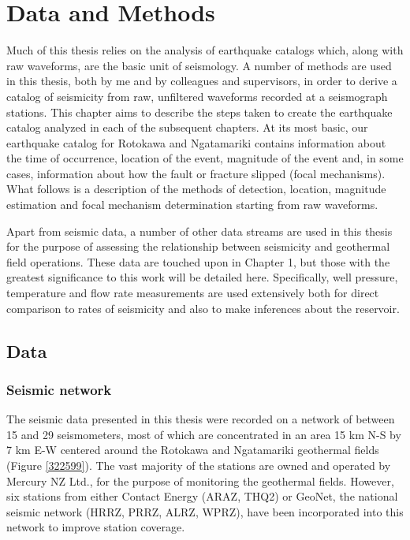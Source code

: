 \chapter{Data and Methods}
Much of this thesis relies on the analysis of earthquake catalogs which, along with raw waveforms, are the basic unit of seismology. A number of methods are used in this thesis, both by me and by colleagues and supervisors, in order to derive a catalog of seismicity from raw, unfiltered waveforms recorded at a seismograph stations. This chapter aims to describe the steps taken to create the earthquake catalog analyzed in each of the subsequent chapters. At its most basic, our earthquake catalog for Rotokawa and Ngatamariki contains information about the time of occurrence, location of the event, magnitude of the event and, in some cases, information about how the fault or fracture slipped (focal mechanisms). What follows is a description of the methods of detection, location, magnitude estimation and focal mechanism determination starting from raw waveforms.

Apart from seismic data, a number of other data streams are used in this thesis for the purpose of assessing the relationship between seismicity and geothermal field operations. These data are touched upon in Chapter 1, but those with the greatest significance to this work will be detailed here. Specifically, well pressure, temperature and flow rate measurements are used extensively both for direct comparison to rates of seismicity and also to make inferences about the reservoir. 

\section{Data}
\subsection{Seismic network}
The seismic data presented in this thesis were recorded on a network of between 15 and 29 seismometers, most of which are concentrated in an area 15 km N-S by 7 km E-W centered around the Rotokawa and Ngatamariki geothermal fields (Figure \ref{322599}). The vast majority of the stations are owned and operated by Mercury NZ Ltd., for the purpose of monitoring the geothermal fields. However, six stations from either Contact Energy (ARAZ, THQ2) or GeoNet, the national seismic network (HRRZ, PRRZ, ALRZ, WPRZ), have been incorporated into this network to improve station coverage.

